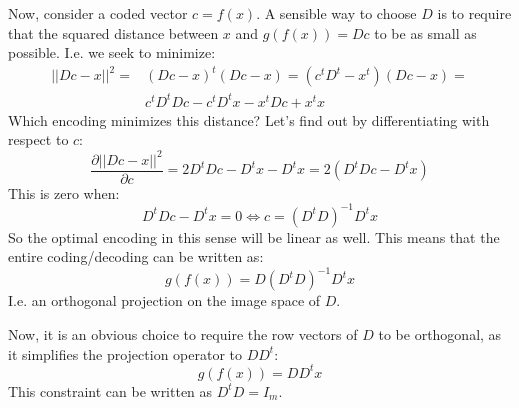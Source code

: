 \documentclass[12pt, a4paper]{article}
\numberwithin{equation}{section}
\begin{document}
Now, consider a coded vector $c=f(x)$. A sensible way to choose $D$ is to require that the squared distance between $x$ and $g(f(x))=Dc$ to be as small as possible. I.e. we seek to minimize:
\begin{align}
||Dc-x||^2=&(Dc-x)^t(Dc-x)=(c^t D^t-x^t)(Dc-x)=\\
&c^t D^t Dc-c^t D^tx-x^t Dc+x^t x
\end{align}
Which encoding minimizes this distance? Let's find out by differentiating with respect to $c$:
\begin{equation}
\frac{\partial ||Dc-x||^2}{\partial c}=2D^t Dc-D^t x-D^t x=2(D^t Dc-D^t x)
\end{equation}
This is zero when:
\begin{equation}
D^t Dc-D^t x=0\Leftrightarrow c=(D^t D)^{-1} D^t x
\end{equation}
So the optimal encoding in this sense will be linear as well. This means that the entire coding/decoding can be written as:
\begin{equation}
g(f(x))=D(D^t D)^{-1} D^t x
\end{equation}
I.e. an orthogonal projection on the image space of $D$.

Now, it is an obvious choice to require the row vectors of $D$ to be orthogonal, as it simplifies the projection operator to $DD^t$:
\begin{equation}
g(f(x))=DD^t x
\end{equation}
This constraint can be written as $D^t D=I_m$.
\end{document}
